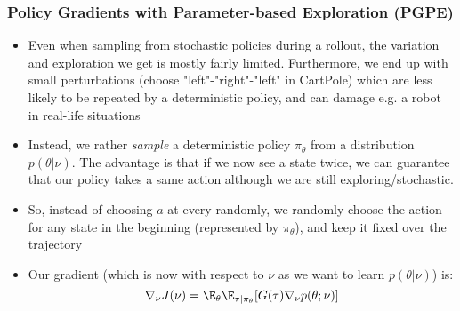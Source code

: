 \subsubsection{Policy Gradients with Parameter-based Exploration (PGPE)}
\begin{itemize}
	\item Even when sampling from stochastic policies during a rollout, the variation and exploration we get is mostly fairly limited. Furthermore, we end up with small perturbations (choose "left"-"right"-"left" in CartPole) which are less likely to be repeated by a deterministic policy, and can damage e.g. a robot in real-life situations
	\item Instead, we rather \textit{sample} a deterministic policy $\pi_{\theta}$ from a distribution $p(\theta|\nu)$.  The advantage is that if we now see a state twice, we can guarantee that our policy takes a same action although we are still exploring/stochastic. 
	\item So, instead of choosing $a$ at every randomly, we randomly choose the action for any state in the beginning (represented by $\pi_{\theta}$), and keep it fixed over the trajectory
	\item Our gradient (which is now with respect to $\nu$ as we want to learn $p(\theta|\nu)$) is:
	$$\nabla_{\nu} J(\nu) = \E_{\theta}\E_{\tau|\pi_{\theta}}[G(\tau) \nabla_{\nu}p(\theta;\nu)]$$
\end{itemize}
